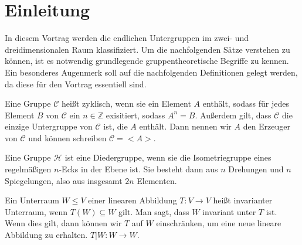 \section{Einleitung}
In diesem Vortrag werden die endlichen Untergruppen im zwei- und dreidimensionalen Raum klassifiziert. Um die nachfolgenden Sätze verstehen zu können, ist es notwendig grundlegende gruppentheoretische Begriffe zu kennen. Ein besonderes Augenmerk soll auf die nachfolgenden Definitionen gelegt werden, da diese für den Vortrag essentiell sind.
\begin{defi}
 Eine Gruppe $\mathcal{C}$ heißt zyklisch, wenn sie ein Element $A$ enthält, sodass für jedes Element $B$ von $\mathcal{C}$ ein $n \in \mathbb{Z}$ exisitiert, sodass $A^n = B$. Außerdem gilt, dass $\mathcal{C}$ die einzige Untergruppe von $\mathcal{C}$ ist, die $A$ enthält. Dann nennen wir $A$ den Erzeuger von $\mathcal{C}$ und können schreiben $\mathcal{C} = <A>$.
\end{defi}
\begin{defi}[Diedergruppe]
 Eine Gruppe $\mathcal{H}$ ist eine Diedergruppe, wenn sie die Isometriegruppe eines regelmäßigen $n$-Ecks in der Ebene ist. Sie besteht dann aus $n$ Drehungen und $n$ Spiegelungen, also aus insgesamt $2n$ Elementen.
\end{defi}
\begin{defi}
 Ein Unterraum $W \leq V$ einer linearen Abbildung $T:V \rightarrow V$ heißt invarianter Unterraum, wenn $T(W) \subseteq W$ gilt. Man sagt, dass $W$ invariant unter $T$ ist. Wenn dies gilt, dann können wir $T$ auf $W$ einschränken, um eine neue lineare Abbildung zu erhalten. $T|W:W\rightarrow W$.
\end{defi}

